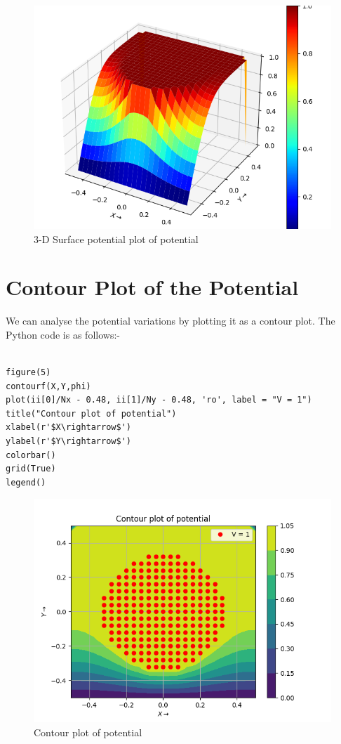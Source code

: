 \documentclass[11pt, a4paper]{article}
\begin{document}
\begin{figure}[tbh]
 \centering
 \includegraphics[scale=0.7]{Ass5_Figure_7.png}  
 \caption{3-D Surface potential plot of potential}
\end{figure}

\section{Contour Plot of the Potential}
We can analyse the potential variations by plotting it as a contour plot. The Python code is as follows:-
 \begin{verbatim}
 
figure(5)
contourf(X,Y,phi)
plot(ii[0]/Nx - 0.48, ii[1]/Ny - 0.48, 'ro', label = "V = 1")
title("Contour plot of potential")
xlabel(r'$X\rightarrow$')
ylabel(r'$Y\rightarrow$')
colorbar()
grid(True)
legend()
  \end{verbatim}

\begin{figure}[!tbh]
 \centering
 \includegraphics[scale=0.7]{Ass5_Figure_8.png}  
 \caption{Contour plot of potential}
\end{figure}
\newpage
\newpage
\end{document}
